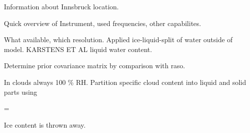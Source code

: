 Information about Innsbruck location.

\startsection[title=HATPRO]

    Quick overview of Instrument, used frequencies, other capabilites.

\stopsection

\startsection[title=Radiosonde Climatology]

    What available, which resolution. Applied ice-liquid-split of water outside
    of model. KARSTENS ET AL liquid water content.

\stopsection

\startsection[title=COSMO7 Simulated Radiosoundings]

    Determine prior covariance matrix by comparison with raso.

    In clouds always 100 \% RH. Partition specific cloud content into liquid
    and solid parts using

    \startformula
        \QLIQ = \QCLOUD \startcases
              \KELVIN \le \TEMP \NR
            \NC \frac{\TEMP - 233.15 \KELVIN}{40 \KELVIN}
                 \KELVIN \lt \TEMP {} \KELVIN \NR
              \KELVIN \le \TEMP \NR
        \stopcases
    \stopformula

    Ice content is thrown away.

\stopsection
